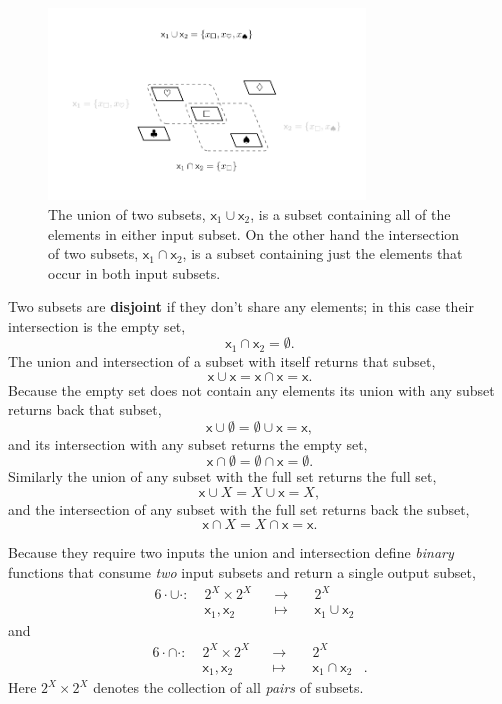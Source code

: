 \documentclass[
  letterpaper,
  DIV=11,
  numbers=noendperiod]{scrartcl}
\begin{document}
\begin{figure}

{\centering \includegraphics[width=0.75\textwidth,height=\textheight]{figures/overlapping_subsets_ui/overlapping_subsets_ui.pdf}

}

\caption{\label{fig-ui}The union of two subsets,
\(\mathsf{x}_1 \cup \mathsf{x}_2\), is a subset containing all of the
elements in either input subset. On the other hand the intersection of
two subsets, \(\mathsf{x}_1 \cap \mathsf{x}_2\), is a subset containing
just the elements that occur in both input subsets.}

\end{figure}

Two subsets are \textbf{disjoint} if they don't share any elements; in
this case their intersection is the empty set, \[
\mathsf{x}_{1} \cap \mathsf{x}_{2} = \emptyset.
\] The union and intersection of a subset with itself returns that
subset, \[
\mathsf{x} \cup \mathsf{x} = \mathsf{x} \cap \mathsf{x} = \mathsf{x}.
\] Because the empty set does not contain any elements its union with
any subset returns back that subset, \[
\mathsf{x} \cup \emptyset = \emptyset \cup \mathsf{x} = \mathsf{x},
\] and its intersection with any subset returns the empty set, \[
\mathsf{x} \cap \emptyset = \emptyset \cap \mathsf{x} = \emptyset.
\] Similarly the union of any subset with the full set returns the full
set, \[
\mathsf{x} \cup X = X \cup \mathsf{x} = X,
\] and the intersection of any subset with the full set returns back the
subset, \[
\mathsf{x} \cap X = X \cap \mathsf{x} = \mathsf{x}.
\]

Because they require two inputs the union and intersection define
\emph{binary} functions that consume \emph{two} input subsets and return
a single output subset, \begin{alignat*}{6}
\cdot \cup \cdot :\; & 2^{X} \times 2^{X}& &\rightarrow& \; & 2^{X} &
\\
& \mathsf{x}_1, \mathsf{x}_{2} & &\mapsto& & \mathsf{x}_1 \cup \mathsf{x}_2 &
\end{alignat*} and \begin{alignat*}{6}
\cdot \cap \cdot :\; & 2^{X} \times 2^{X}& &\rightarrow& \; & 2^{X} &
\\
& \mathsf{x}_1, \mathsf{x}_{2} & &\mapsto& & \mathsf{x}_1 \cap \mathsf{x}_2 &.
\end{alignat*} Here \(2^{X} \times 2^{X}\) denotes the collection of all
\emph{pairs} of subsets.
\end{document}
